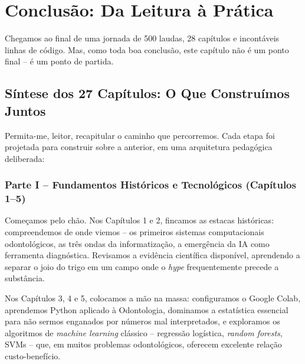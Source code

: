 \chapter{Conclusão: Da Leitura à Prática}
\label{cap:conclusao-final}

\nivelzero

Chegamos ao final de uma jornada de 500 laudas, 28 capítulos e incontáveis
linhas de código. Mas, como toda boa conclusão, este capítulo não é um ponto
final -- é um ponto de partida.

\section{Síntese dos 27 Capítulos: O Que Construímos Juntos}
\label{sec:sintese}

\nivelum

Permita-me, leitor, recapitular o caminho que percorremos. Cada etapa foi
projetada para construir sobre a anterior, em uma arquitetura pedagógica
deliberada:

\subsection{Parte I -- Fundamentos Históricos e Tecnológicos (Capítulos 1--5)}

Começamos pelo chão. Nos Capítulos 1 e 2, fincamos as estacas históricas:
compreendemos de onde viemos -- os primeiros sistemas computacionais
odontológicos, as três ondas da informatização, a emergência da IA como
ferramenta diagnóstica. Revisamos a evidência científica disponível, aprendendo
a separar o joio do trigo em um campo onde o \textit{hype} frequentemente
precede a substância.

Nos Capítulos 3, 4 e 5, colocamos a mão na massa: configuramos o Google Colab,
aprendemos Python aplicado à Odontologia, dominamos a estatística essencial
para não sermos enganados por números mal interpretados, e exploramos os
algoritmos de \textit{machine learning} clássico -- regressão logística,
\textit{random forests}, SVMs -- que, em muitos problemas odontológicos,
oferecem excelente relação custo-benefício.

